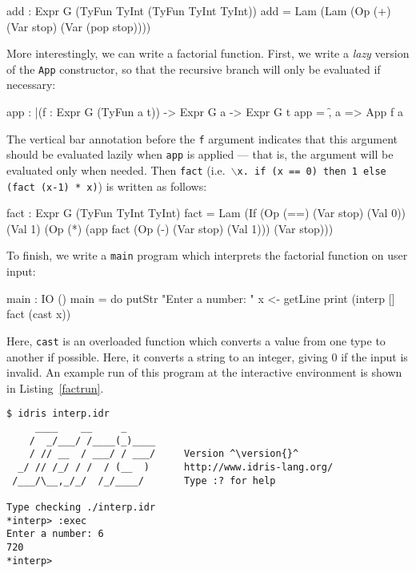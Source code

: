 \begin{code}
add : Expr G (TyFun TyInt (TyFun TyInt TyInt))
add = Lam (Lam (Op (+) (Var stop) (Var (pop stop))))
\end{code}

\noindent
More interestingly, we can write a factorial function.
First, we write a \emph{lazy} version of the \texttt{App} constructor, so that the recursive branch will only be evaluated if necessary:

\begin{code} 
app : |(f : Expr G (TyFun a t)) -> Expr G a -> Expr G t
app = \f, a => App f a
\end{code}

\noindent
The vertical bar annotation before the \texttt{f} argument indicates that this argument should be evaluated lazily when \texttt{app} is applied --- that is, the argument will be evaluated only when needed.
Then \texttt{fact} (i.e.\ \texttt{$\backslash$x. if (x == 0) then 1 else (fact (x-1) * x)}) is written as follows:

\begin{code}
fact : Expr G (TyFun TyInt TyInt)
fact = Lam (If (Op (==) (Var stop) (Val 0))
               (Val 1) (Op (*) (app fact (Op (-) (Var stop) (Val 1))) 
                               (Var stop)))
\end{code}

To finish, we write a \texttt{main} program which interprets the factorial function on user input:

\begin{code}
main : IO ()
main = do putStr "Enter a number: "
          x <- getLine
          print (interp [] fact (cast x)) 
\end{code}

\noindent
Here, \texttt{cast} is an overloaded function which converts a value from one type to another if possible.
Here, it converts a string to an integer, giving 0 if the input is invalid.
An example run of this program at the \Idris{} interactive environment is shown in Listing~\ref{factrun}.

\begin{lstlisting}[caption={Running the well-typed interpreter}, label=factrun, style=stdout]
$ idris interp.idr  
     ____    __     _                                          
    /  _/___/ /____(_)____                                     
    / // __  / ___/ / ___/     Version ^\version{}^
  _/ // /_/ / /  / (__  )      http://www.idris-lang.org/      
 /___/\__,_/_/  /_/____/       Type :? for help                

Type checking ./interp.idr
*interp> :exec 
Enter a number: 6 
720
*interp> 
\end{lstlisting}

